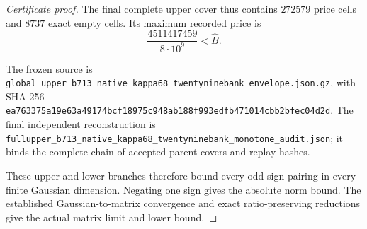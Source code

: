 \documentclass[11pt]{article}
\begin{document}
\begin{proof}[Certificate proof]
The final complete upper cover thus contains $272579$ price cells and
$8737$ exact empty cells. Its maximum recorded price is
\[
 \frac{4511417459}{8\cdot10^9}<\widehat B.
\]
\begingroup\raggedright
The frozen source is
\texttt{global\_\allowbreak upper\_\allowbreak b713\_\allowbreak native\_\allowbreak kappa68\_\allowbreak twentyninebank\_\allowbreak envelope.json.gz},
with SHA-256
\texttt{ea763375a19e63a49174bcf18975c948ab188f993edfb471014cbb2bfec04d2d}.
The final independent reconstruction is
\texttt{fullupper\_\allowbreak b713\_\allowbreak native\_\allowbreak kappa68\_\allowbreak twentyninebank\_\allowbreak monotone\_\allowbreak audit.json};
it binds the complete chain of accepted parent covers and replay hashes.
\par\endgroup
These upper and lower branches therefore bound every odd sign pairing
in every finite Gaussian dimension. Negating one sign gives the absolute
norm bound. The established Gaussian-to-matrix convergence and exact
ratio-preserving reductions give the actual matrix limit and lower bound.
\end{proof}
\end{document}

